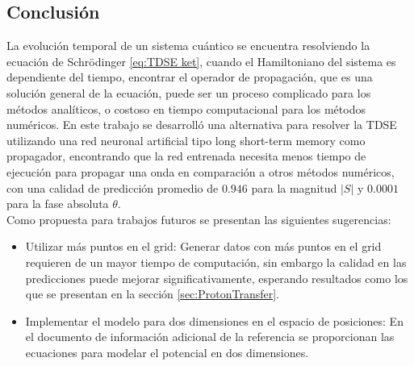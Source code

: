\subsection{Conclusión}
La evolución temporal de un sistema cuántico se encuentra resolviendo la ecuación de Schrödinger \autoref{eq:TDSE ket}, cuando el Hamiltoniano del sistema es dependiente del tiempo, encontrar el operador de propagación, que es una solución general de la ecuación, puede ser un proceso complicado para los métodos analíticos, o costoso en tiempo computacional para los métodos numéricos. En este trabajo se desarrolló una alternativa para resolver la \acs{TDSE} utilizando una red neuronal artificial tipo long short-term memory como propagador, encontrando que la red entrenada necesita menos tiempo de ejecución para propagar una onda en comparación a otros métodos numéricos, con una calidad de predicción promedio de $0.946$ para la magnitud $|S|$ y $0.0001$ para la fase absoluta $\theta$. \\
Como propuesta para trabajos futuros se presentan las siguientes sugerencias:
\begin{itemize}[label=\textcolor{CTtitle}{\textbullet}]
\item Utilizar más puntos en el grid: Generar datos con más puntos en el grid requieren de un mayor tiempo de computación, sin embargo la calidad en las predicciones puede mejorar significativamente, esperando resultados como los que se presentan en la sección \autoref{sec:ProtonTransfer}.
\item Implementar el modelo para dos dimensiones en el espacio de posiciones: En el documento de información adicional de la referencia \cite{Main:2021} se proporcionan las ecuaciones para modelar el potencial en dos dimensiones.
\end{itemize}